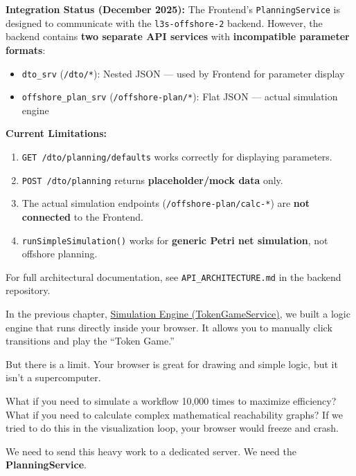 \documentclass[a4paper,11pt,oneside]{report}
\begin{document}
\begin{tcolorbox}[colback=yellow!10, colframe=orange!80!black, title={\textbf{WARNING: Architectural Notice}}]
\textbf{Integration Status (December 2025):} The Frontend's \texttt{PlanningService} is designed
to communicate with the \texttt{l3s-offshore-2} backend. However, the backend contains
\textbf{two separate API services} with \textbf{incompatible parameter formats}:

\begin{itemize}
    \item \texttt{dto\_srv} (\texttt{/dto/*}): Nested JSON --- used by Frontend for parameter display
    \item \texttt{offshore\_plan\_srv} (\texttt{/offshore-plan/*}): Flat JSON --- actual simulation engine
\end{itemize}

\textbf{Current Limitations:}
\begin{enumerate}
    \item \texttt{GET /dto/planning/defaults} works correctly for displaying parameters.
    \item \texttt{POST /dto/planning} returns \textbf{placeholder/mock data} only.
    \item The actual simulation endpoints (\texttt{/offshore-plan/calc-*}) are \textbf{not connected} to the Frontend.
    \item \texttt{runSimpleSimulation()} works for \textbf{generic Petri net simulation}, not offshore planning.
\end{enumerate}

For full architectural documentation, see \texttt{API\_ARCHITECTURE.md} in the backend repository.
\end{tcolorbox}

In the previous chapter, \hyperref[chap:tokengame]{Simulation Engine (TokenGameService)}, we built a logic engine that runs directly inside your browser. It allows you to manually click transitions and play the ``Token Game.''

But there is a limit. Your browser is great for drawing and simple logic, but it isn't a supercomputer.

What if you need to simulate a workflow 10,000 times to maximize efficiency? What if you need to calculate complex mathematical reachability graphs? If we tried to do this in the visualization loop, your browser would freeze and crash.

We need to send this heavy work to a dedicated server. We need the \textbf{PlanningService}.
\end{document}
